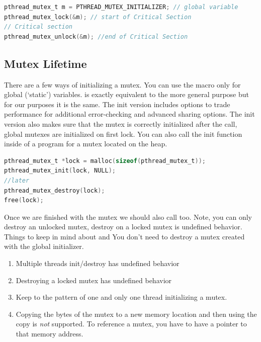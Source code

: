 \begin{lstlisting}[language=C]
pthread_mutex_t m = PTHREAD_MUTEX_INITIALIZER; // global variable
pthread_mutex_lock(&m); // start of Critical Section
// Critical section
pthread_mutex_unlock(&m); //end of Critical Section
\end{lstlisting}

\subsection{Mutex Lifetime}

There are a few ways of initializing a mutex.
You can use the macro  only for global (`static') variables.
 is exactly equivalent to the more general purpose  but for our purposes it is the same.
The init version includes options to trade performance for additional error-checking and advanced sharing options.
The init version also makes sure that the mutex is correctly initialized after the call, global mutexes are initialized on first lock.
You can also call the init function inside of a program for a mutex located on the heap.

\begin{lstlisting}[language=C]
pthread_mutex_t *lock = malloc(sizeof(pthread_mutex_t));
pthread_mutex_init(lock, NULL);
//later
pthread_mutex_destroy(lock);
free(lock);
\end{lstlisting}

Once we are finished with the mutex we should also call  too.
Note, you can only destroy an unlocked mutex, destroy on a locked mutex is undefined behavior.
Things to keep in mind about  and 
You don't need to destroy a mutex created with the global initializer.

\begin{enumerate}
\item Multiple threads init/destroy has undefined behavior
\item Destroying a locked mutex has undefined behavior
\item Keep to the pattern of one and only one thread initializing a mutex.
\item Copying the bytes of the mutex to a new memory location and then using the copy is \emph{not} supported.
  To reference a mutex, you have to have a pointer to that memory address.
\end{enumerate}

